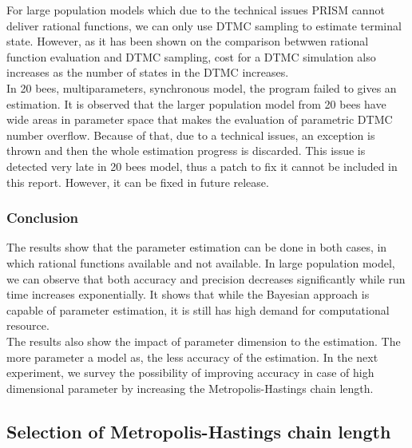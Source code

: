 \documentclass[12pt]{article}
\theoremstyle{definition}
\begin{document}
For large population models which due to the technical issues PRISM cannot
deliver rational functions, we can only use DTMC sampling to estimate terminal
state. However, as it has been shown on the comparison betwwen rational function
evaluation and DTMC sampling, cost for a DTMC simulation also increases as the
number of states in the DTMC increases.\\
In 20 bees, multiparameters, synchronous model, the program failed to gives an
estimation. It is observed that the larger population model from 20 bees have
wide areas in parameter space that makes the evaluation of parametric DTMC
number overflow. Because of that, due to a technical issues, an exception is
thrown and then the whole estimation progress is discarded. This issue is
detected very late in 20 bees model, thus a patch to fix it cannot be included
in this report. However, it can be fixed in future release. 

\subsubsection{Conclusion}
The results show that the parameter estimation can be done in both cases, in
which rational functions available and not available. In large population model,
we can observe that both accuracy and precision decreases significantly while
run time increases exponentially. It shows that while the Bayesian approach is
capable of parameter estimation, it is still has high demand for computational
resource.\\
The results also show the impact of parameter dimension to the estimation. The
more parameter a model as, the less accuracy of the estimation. In the next
experiment, we survey the possibility of improving accuracy in case of high
dimensional parameter by increasing the Metropolis-Hastings chain length.


\subsection{Selection of Metropolis-Hastings chain length}
\end{document}
